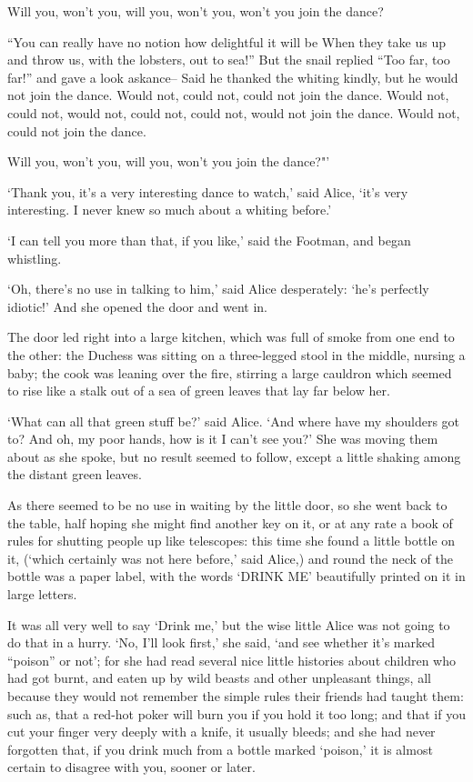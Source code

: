 \documentclass[statementpaper,twoside,openany]{memoir}
\begin{document}
Will you, won't you, will you, won't you, won't you join the dance?

``You can really have no notion how delightful it will be When they take us up and throw us, with the lobsters, out to sea!'' But the snail replied ``Too far, too far!'' and gave a look askance-- Said he thanked the whiting kindly, but he would not join the dance. Would not, could not, could not join the dance. Would not, could not, would not, could not, could not, would not join the dance. Would not, could not join the dance.

Will you, won't you, will you, won't you join the dance?"'

`Thank you, it's a very interesting dance to watch,' said Alice, `it's very interesting. I never knew so much about a whiting before.'

`I can tell you more than that, if you like,' said the Footman, and began whistling.

`Oh, there's no use in talking to him,' said Alice desperately: `he's perfectly idiotic!' And she opened the door and went in.

The door led right into a large kitchen, which was full of smoke from one end to the other: the Duchess was sitting on a three-legged stool in the middle, nursing a baby; the cook was leaning over the fire, stirring a large cauldron which seemed to rise like a stalk out of a sea of green leaves that lay far below her.

`What can all that green stuff be?' said Alice. `And where have my shoulders got to? And oh, my poor hands, how is it I can't see you?' She was moving them about as she spoke, but no result seemed to follow, except a little shaking among the distant green leaves.

As there seemed to be no use in waiting by the little door, so she went back to the table, half hoping she might find another key on it, or at any rate a book of rules for shutting people up like telescopes: this time she found a little bottle on it, (`which certainly was not here before,' said Alice,) and round the neck of the bottle was a paper label, with the words `DRINK ME' beautifully printed on it in large letters.

It was all very well to say `Drink me,' but the wise little Alice was not going to do that in a hurry. `No, I'll look first,' she said, `and see whether it's marked ``poison'' or not'; for she had read several nice little histories about children who had got burnt, and eaten up by wild beasts and other unpleasant things, all because they would not remember the simple rules their friends had taught them: such as, that a red-hot poker will burn you if you hold it too long; and that if you cut your finger very deeply with a knife, it usually bleeds; and she had never forgotten that, if you drink much from a bottle marked `poison,' it is almost certain to disagree with you, sooner or later.
\end{document}
